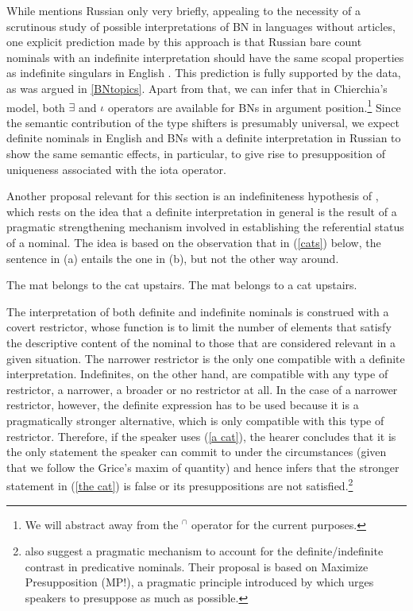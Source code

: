 \documentclass[output=paper,colorlinks,citecolor=brown]{langscibook}
\begin{document}
While \citet{chierchia98} mentions Russian only very briefly, appealing to the necessity of a scrutinous study of possible interpretations of BN in languages without articles, one explicit prediction made by this approach is that Russian bare count nominals with an indefinite interpretation should have the same scopal properties as indefinite singulars in English \citep[][362]{chierchia98}. This prediction is fully supported by the data, as was argued in \ref{BNtopics}. Apart from that, we can infer that in Chierchia's model, both $\exists$ and $\iota$ operators are available for BNs in argument position.\footnote{We will abstract away from the $^{\cap}$ operator for the current purposes.} Since the semantic contribution of the type shifters is presumably universal, we expect definite nominals in English and BNs with a definite interpretation in Russian to show the same semantic effects, in particular, to give rise to presupposition of uniqueness associated with the iota operator. 

Another proposal relevant for this section is an indefiniteness hypothesis of \citet{Heim2011}, which rests on the idea that a definite interpretation in general is the result of a pragmatic strengthening mechanism involved in establishing the referential status of a nominal. The idea is based on the observation that in (\ref{cats}) below, the sentence in (a) entails the one in (b), but not the other way around. 

\ea \label{cats}
\ea The mat belongs to the cat upstairs. \label{the cat}
\ex The mat belongs to a cat upstairs. \label{a cat}
\z
\z

\noindent The interpretation of both definite and indefinite nominals is construed with a covert restrictor, whose function is to limit the number of elements that satisfy the descriptive content of the nominal to those that are considered relevant in a given situation. The narrower restrictor is the only one compatible with a definite interpretation. Indefinites, on the other hand, are compatible with any type of restrictor, a narrower, a broader or no restrictor at all. In the case of a narrower restrictor, however, the definite expression has to be used because it is a pragmatically stronger alternative, which is only compatible with this type of restrictor. Therefore, if the speaker uses (\ref{a cat}), the hearer concludes that it is the only statement the speaker can commit to under the circumstances (given that we follow the Grice's maxim of quantity) and hence infers that the stronger statement in (\ref{the cat}) is false or its presuppositions are not satisfied.\footnote{\citet{coppockbeaver15} also suggest a pragmatic mechanism to account for the definite/indefinite contrast in predicative nominals. Their proposal is based on Maximize Presupposition (MP!), a pragmatic principle introduced by \citet{Heim1991} which urges speakers to presuppose as much as possible.}
\end{document}
